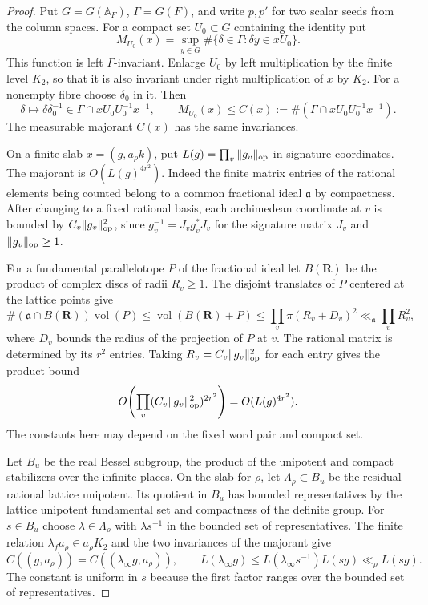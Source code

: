\begin{proof}

Put \(G=G(\mathbb A_F)\), \(\Gamma=G(F)\), and write \(p,p'\)
for two scalar seeds from the column spaces.
For a compact set \(U_0\subset G\) containing the identity put
\[
 M_{U_0}(x)=\sup_{y\in G}\#\{\delta\in\Gamma:\delta y\in xU_0\}.
\]
This function is left \(\Gamma\)-invariant. Enlarge \(U_0\) by left
multiplication by the finite level \(K_2\), so that it is also invariant
under right multiplication of \(x\) by \(K_2\). For a nonempty fibre choose \(\delta_0\) in it. Then
\[
 \delta\longmapsto\delta\delta_0^{-1}\in
       \Gamma\cap xU_0U_0^{-1}x^{-1},\qquad
 M_{U_0}(x)\le C(x):=\#(\Gamma\cap xU_0U_0^{-1}x^{-1}).
\]
The measurable majorant \(C(x)\) has the same invariances.

On a finite slab \(x=(g,a_\rho k)\), put \(L(g)=\prod_v\|g_v\|_{\rm op}\)
in signature coordinates. The majorant is \(O(L(g)^{4r^2})\).
Indeed the finite matrix entries of the rational elements being counted
belong to a common fractional ideal \(\mathfrak a\) by compactness. After changing
to a fixed rational basis, each archimedean coordinate at \(v\) is
bounded by \(C_v\|g_v\|_{\rm op}^2\), since \(g_v^{-1}=J_vg_v^*J_v\)
for the signature matrix \(J_v\) and \(\|g_v\|_{\rm op}\ge1\).

For a fundamental parallelotope \(P\) of the fractional ideal let
\(B(\mathbf R)\) be the product of complex discs of radii \(R_v\ge1\).
The disjoint translates of \(P\) centered at the lattice points give
\[
 \#(\mathfrak a\cap B(\mathbf R))\operatorname{vol}(P)
 \le \operatorname{vol}(B(\mathbf R)+P)
 \le \prod_v\pi(R_v+D_v)^2\ll_{\mathfrak a}\prod_v R_v^2 ,
\]
where \(D_v\) bounds the radius of the projection of \(P\) at \(v\).
The rational matrix is determined
by its \(r^2\) entries. Taking \(R_v=C_v\|g_v\|_{\rm op}^2\)
for each entry gives the product bound
\[
 O\!\left(\prod_v(C_v\|g_v\|_{\rm op}^2)^{2r^2}\right)
      =O(L(g)^{4r^2}).
\]
The constants here may depend on the fixed word pair and compact set.

Let \(B_u\) be the real Bessel subgroup, the product of the
unipotent and compact stabilizers over the infinite places.
On the slab for \(\rho\), let \(\Lambda_\rho\subset B_u\)
be the residual rational lattice unipotent. Its quotient in
\(B_u\) has bounded representatives by the lattice unipotent
fundamental set and compactness of the definite group. For \(s\in B_u\)
choose \(\lambda\in\Lambda_\rho\) with \(\lambda s^{-1}\)
in the bounded set of representatives. The finite relation \(\lambda_f a_\rho\in a_\rho K_2\) and the
two invariances of the majorant give
\[
 C((g,a_\rho))=C((\lambda_\infty g,a_\rho)),\qquad
 L(\lambda_\infty g)\le L(\lambda_\infty s^{-1})L(sg)\ll_\rho L(sg).
\]
The constant is uniform in \(s\) because the first factor ranges
over the bounded set of representatives.


\end{proof}
